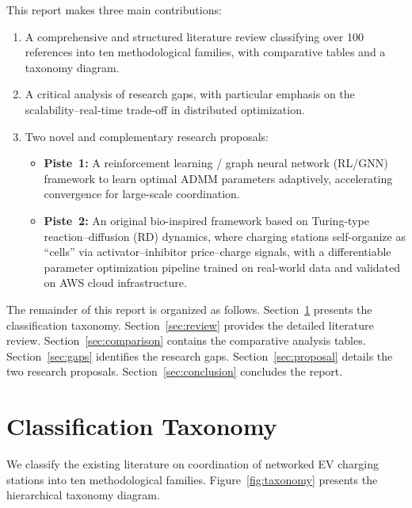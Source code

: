 \documentclass[review]{elsarticle}
\begin{document}
\hspace{0.5cm}This report makes three main contributions:
\begin{enumerate}
    \item A comprehensive and structured literature review classifying over 100 references into ten methodological families, with comparative tables and a taxonomy diagram.
    \item A critical analysis of research gaps, with particular emphasis on the scalability--real-time trade-off in distributed optimization.
    \item Two novel and complementary research proposals:
    \begin{itemize}
        \item \textbf{Piste~1:} A reinforcement learning / graph neural network (RL/GNN) framework to learn optimal ADMM parameters adaptively, accelerating convergence for large-scale coordination.
        \item \textbf{Piste~2:} An original bio-inspired framework based on Turing-type reaction--diffusion (RD) dynamics, where charging stations self-organize as ``cells'' via activator--inhibitor price--charge signals, with a differentiable parameter optimization pipeline trained on real-world data and validated on AWS cloud infrastructure.
    \end{itemize}
\end{enumerate}

\hspace{0.5cm}The remainder of this report is organized as follows. Section~\ref{sec:taxonomy} presents the classification taxonomy. Section~\ref{sec:review} provides the detailed literature review. Section~\ref{sec:comparison} contains the comparative analysis tables. Section~\ref{sec:gaps} identifies the research gaps. Section~\ref{sec:proposal} details the two research proposals. Section~\ref{sec:conclusion} concludes the report.


\section{Classification Taxonomy}\label{sec:taxonomy}

\hspace{0.5cm}We classify the existing literature on coordination of networked EV charging stations into ten methodological families. Figure~\ref{fig:taxonomy} presents the hierarchical taxonomy diagram.
\end{document}
